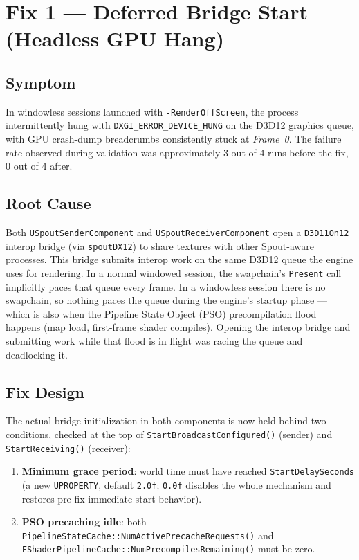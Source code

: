 \documentclass[11pt,a4paper]{article}
\begin{document}
\section{Fix 1 --- Deferred Bridge Start (Headless GPU Hang)}
\label{sec:deferred-start}

\subsection{Symptom}
In windowless sessions launched with \texttt{-RenderOffScreen}, the process
intermittently hung with \texttt{DXGI\_ERROR\_DEVICE\_HUNG} on the D3D12
graphics queue, with GPU crash-dump breadcrumbs consistently stuck at
\emph{Frame~0}. The failure rate observed during validation was
approximately 3 out of 4 runs before the fix, 0 out of 4 after.

\subsection{Root Cause}
Both \texttt{USpoutSenderComponent} and \texttt{USpoutReceiverComponent}
open a \texttt{D3D11On12} interop bridge (via \texttt{spoutDX12}) to share
textures with other Spout-aware processes. This bridge submits interop
work on the same D3D12 queue the engine uses for rendering. In a normal
windowed session, the swapchain's \texttt{Present} call implicitly paces
that queue every frame. In a windowless session there is no swapchain, so
nothing paces the queue during the engine's startup phase --- which is also
when the Pipeline State Object (PSO) precompilation flood happens (map
load, first-frame shader compiles). Opening the interop bridge and
submitting work while that flood is in flight was racing the queue and
deadlocking it.

\subsection{Fix Design}
The actual bridge initialization in both components is now held behind two
conditions, checked at the top of \texttt{StartBroadcastConfigured()} (sender)
and \texttt{StartReceiving()} (receiver):

\begin{enumerate}
    \item \textbf{Minimum grace period}: world time must have reached
        \texttt{StartDelaySeconds} (a new \texttt{UPROPERTY}, default
        \texttt{2.0f}; \texttt{0.0f} disables the whole mechanism and
        restores pre-fix immediate-start behavior).
    \item \textbf{PSO precaching idle}: both
        \texttt{PipelineStateCache::NumActivePrecacheRequests()} and
        \texttt{FShaderPipelineCache::NumPrecompilesRemaining()} must be
        zero.
\end{enumerate}
\end{document}
